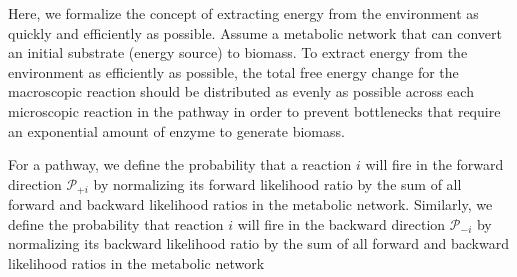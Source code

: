 Here, we formalize the concept of extracting energy from the environment as quickly and efficiently as possible. Assume a metabolic network that can convert an initial substrate (energy source) to biomass. To extract energy from the environment as efficiently as possible, the total free energy change for the macroscopic reaction should be distributed as evenly as possible across each microscopic reaction in the pathway in order to prevent bottlenecks that require an exponential amount of enzyme to generate biomass.


For a pathway, we define the probability that a reaction $i$ will fire in the forward  direction ${\mathcal P_{+i}}$ by normalizing its forward likelihood ratio by the sum of all forward and backward likelihood ratios in the metabolic network. Similarly, we define the probability that reaction $i$ will fire in the backward direction $\mathcal P_{-i}$ by normalizing its backward likelihood ratio by  the sum of all forward and backward likelihood ratios in the metabolic network